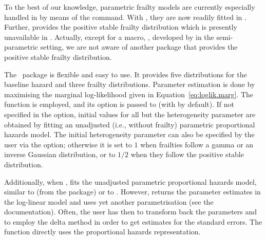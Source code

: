 To the best of our knowledge, parametric frailty models are currently especially handled in  
  by means of the  command.
With , they are now readily fitted in .
Further,  provides the positive stable frailty distribution 
  which is presently unavailable in .
Actually, except for a  macro, , 
  developed by \cite{ShuKlein99} in the semi-parametric setting, 
  we are not aware of another package that provides the positive stable frailty distribution.

The ~package is flexible and easy to use. 
It provides five distributions for the baseline hazard and three frailty distributions.
Parameter estimation is done by maximising the marginal log-likelihood given in Equation~\ref{eq:loglik.marg}.
The  function is employed, 
  and its  option is passed to  (with  by default).
If not specified in the  option, 
  initial values for all but the heterogeneity parameter are obtained by fitting 
  an unadjusted (i.e., without frailty) parametric proportional hazards model.
The initial heterogeneity parameter can also be specified by the user via the  option;
  otherwise it is set to $1$ when frailties follow a gamma or an inverse Gaussian distribution, 
  or to $1 \slash 2$ when they follow the positive stable distribution.

Additionally, when ,  fits the unadjusted parametric proportional hazards model,
  similar to  (from the  package) or to 
  \cite[from the ~package;][]{R:eha}.
However,  returns the parameter estimates in the log-linear model 
  and  uses yet another parametrisation (see the documentation).
Often, the user has then to transform back the parameters 
  and to employ the delta method in order to get estimates for the standard errors.
The  function directly uses the proportional hazards representation.

